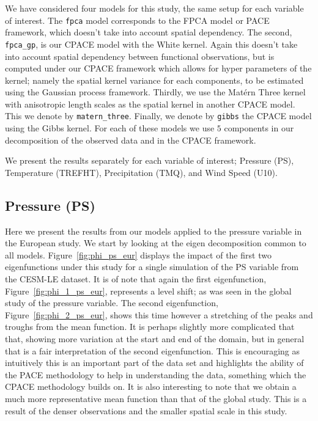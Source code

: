 We have considered four models for this study, the same setup for each variable of interest.
The \verb*|fpca| model corresponds to the FPCA model or PACE framework, which doesn't take into account spatial dependency.
The second, \verb*|fpca_gp|, is our CPACE model with the White kernel.
Again this doesn't take into account spatial dependency between functional observations, but is computed under our CPACE framework which allows for hyper parameters of the kernel; namely the spatial kernel variance for each components, to be estimated using the Gaussian process framework.
Thirdly, we use the Mat\'ern Three kernel with anisotropic length scales as the spatial kernel in another CPACE model.
This we denote by \verb*|matern_three|.
Finally, we denote by \verb*|gibbs| the CPACE model using the Gibbs kernel.
For each of these models we use $5$ components in our decomposition of the observed data and in the CPACE framework. 

We present the results separately for each variable of interest; Pressure (PS), Temperature (TREFHT), Precipitation (TMQ), and Wind Speed (U10).

\subsection{Pressure (PS)\label{ssec:cesm_ps_eur}}
Here we present the results from our models applied to the pressure variable in the European study.
We start by looking at the eigen decomposition common to all models.
Figure~\ref{fig:phi_ps_eur} displays the impact of the first two eigenfunctions under this study for a single simulation of the PS variable from the CESM-LE dataset.
It is of note that again the first eigenfunction, Figure~\ref{fig:phi_1_ps_eur}, represents a level shift; as was seen in the global study of the pressure variable.
The second eigenfunction, Figure~\ref{fig:phi_2_ps_eur}, shows this time however a stretching of the peaks and troughs from the mean function.
It is perhaps slightly more complicated that that,  showing more variation at the start and end of the domain, but in general that is a fair interpretation of the second eigenfunction.
This is encouraging as intuitively this is an important part of the data set and highlights the ability of the PACE methodology to help in understanding the data, something which the CPACE methodology builds on.
It is also interesting to note that we obtain a much more representative mean function than that of the global study.
This is a result of the denser observations and the smaller spatial scale in this study.

